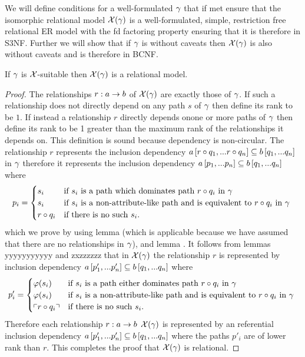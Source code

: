 We will define conditions for a well-formulated $\gamma$  that if met ensure 
 that the isomorphic relational model $\mathcal{X}(\gamma)$ is a well-formulated, simple, restriction free relational ER model with the fd factoring property 
ensuring that it is therefore in S3NF.  Further we will show that if $\gamma$ is without caveats then $\mathcal{X}(\gamma)$ is also without caveats and is therefore in BCNF. 

\begin{lemma}
If $\gamma$ is $\mathcal{X}$-suitable then $\mathcal{X}(\gamma)$ is a relational model.
\end{lemma}
\begin{proof}
The relationships $r: a \rightarrow b$ of $\mathcal{X}(\gamma)$ are exactly those of $\gamma$. If such a relationship does not directly depend on any path $s$ of $\gamma$ then define its rank to be $1$.
If instead a relationship $r$ directly depends onone or more paths of $\gamma$ then define its rank to be 1 greater than the maximum rank of the relationships it depends on. 
This definition is sound because dependency is non-circular.
The relationship $r$ represents the inclusion dependency $a\left[r \circ q_1,...r \circ q_n\right]\subseteq b\left[q_1,...q_n\right]$ in $\gamma$ therefore it represents
the inclusion dependency $a\left[p_1,...p_n\right]\subseteq b\left[q_1,...q_n\right]$ where 
$$
p_i =
\begin{cases} 
    s_i         & \mbox{if $s_i$ is a path which dominates path $r \circ q_i$ in $\gamma$} \\
    s_i         & \mbox{if $s_i$ is a non-attribute-like path and is equivalent to  $r \circ q_i$ in $\gamma$ }  \\
    r \circ q_i & \mbox{if there is no such $s_i$.}
\end{cases} 
$$
which we prove by using lemma  (which is applicable because we have assumed 
that there are no   relationships in $\gamma$), and lemma .
It follows from lemmas yyyyyyyyyyy  and zxzzzzzz that in $\mathcal{X}(\gamma)$ the relationship $r$ is represented by inclusion dependency $a\left[p'_1,...p'_n\right]\subseteq b\left[q_1,...q_n\right]$ where
$$
p'_i =
\begin{cases}
   \varphi(s_i)     & \mbox{if $s_i$ is a path  either dominates path $r \circ q_i$ in $\gamma$} \\
   \varphi(s_i)     & \mbox{if $s_i$ is a non-attribute-like path and is equivalent to  $r \circ q_i$ in $\gamma$ }  \\
   \left\ulcorner r \circ q_i\right\urcorner  & \mbox{if there is no such $s_i$.}
\end{cases} 
$$
Therefore each relationship $r: a \rightarrow b$ $\mathcal{X}(\gamma)$ is represented by an referential inclusion dependency $a\left[p'_1,...p'_n\right]\subseteq b\left[q_1,...q_n\right]$
where the paths $p'_i$ are of lower rank than $r$. This completes the proof that $\mathcal{X}(\gamma)$ is relational.
\end{proof}


